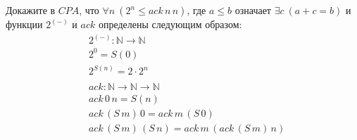 \begin{task}[4]
	Докажите в $CPA$, что $\forall n\ (2^n \leq ack\,n\,n)$, где $a \leq b$ означает $\exists c\ (a + c = b)$ и функции $2^{(-)}$ и $ack$ определены следующим образом:
	\begin{align*}
	& 2^{(-)} : \mathbb{N} \to \mathbb{N} \\
	& 2^0 = S(0) \\
	& 2^{S(n)} = 2 \cdot 2^n \\
	& \\
	& ack : \mathbb{N} \to \mathbb{N} \to \mathbb{N} \\
	& ack\,0\,n = S(n) \\
	& ack\,(S\,m)\,0 = ack\,m\,(S\,0) \\
	& ack\,(S\,m)\,(S\,n) = ack\,m\,(ack\,(S\,m)\,n)
	\end{align*}
\end{task}
\begin{solution}
\end{solution}

